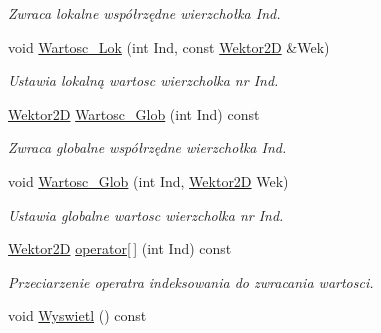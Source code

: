 \begin{DoxyCompactItemize}
\begin{DoxyCompactList}\small\item\em Zwraca lokalne współrzędne wierzchołka Ind. \end{DoxyCompactList}\item 
void \hyperlink{class_objekt___graficzny_aca0acf1d25d7db81c40e9762a7f85072}{Wartosc\+\_\+\+Lok} (int Ind, const \hyperlink{class_wektor2_d}{Wektor2\+D} \&Wek)
\begin{DoxyCompactList}\small\item\em Ustawia lokalną wartosc wierzcholka nr Ind. \end{DoxyCompactList}\item 
\hypertarget{class_objekt___graficzny_a9872ecb81143f6f5a7e2296b354c0bcc}{\hyperlink{class_wektor2_d}{Wektor2\+D} \hyperlink{class_objekt___graficzny_a9872ecb81143f6f5a7e2296b354c0bcc}{Wartosc\+\_\+\+Glob} (int Ind) const }\label{class_objekt___graficzny_a9872ecb81143f6f5a7e2296b354c0bcc}

\begin{DoxyCompactList}\small\item\em Zwraca globalne współrzędne wierzchołka Ind. \end{DoxyCompactList}\item 
void \hyperlink{class_objekt___graficzny_afbe393725fafac38ac1dbf42486c1467}{Wartosc\+\_\+\+Glob} (int Ind, \hyperlink{class_wektor2_d}{Wektor2\+D} Wek)
\begin{DoxyCompactList}\small\item\em Ustawia globalne wartosc wierzcholka nr Ind. \end{DoxyCompactList}\item 
\hyperlink{class_wektor2_d}{Wektor2\+D} \hyperlink{class_objekt___graficzny_a14be7409a5989797c6197536d8f577d5}{operator\mbox{[}$\,$\mbox{]}} (int Ind) const 
\begin{DoxyCompactList}\small\item\em Przeciarzenie operatra indeksowania do zwracania wartosci. \end{DoxyCompactList}\item 
\hypertarget{class_objekt___graficzny_ae3e239a8ea20f6849d13c1eaf4a29b28}{void \hyperlink{class_objekt___graficzny_ae3e239a8ea20f6849d13c1eaf4a29b28}{Wyswietl} () const }\label{class_objekt___graficzny_ae3e239a8ea20f6849d13c1eaf4a29b28}


\end{DoxyCompactItemize}
